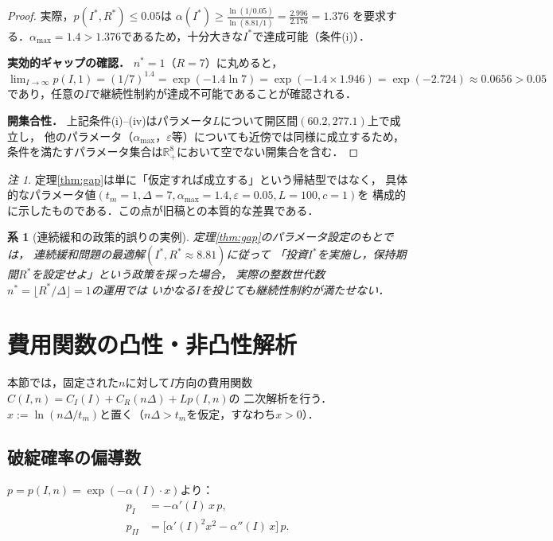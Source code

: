 \documentclass[12pt,a4paper]{article}
\theoremstyle{plain}
\newtheorem{corollary}[theorem]{系}
\theoremstyle{definition}
\theoremstyle{remark}
\newtheorem{remark}[theorem]{注}
\newcommand{\R}{\mathbb{R}}
\begin{document}
\begin{proof}
実際，$p(I^*, R^*) \le 0.05$は
$\alpha(I^*) \ge \frac{\ln(1/0.05)}{\ln(8.81/1)} = \frac{2.996}{2.176} = 1.376$
を要求する．$\alpha_{\max} = 1.4 > 1.376$であるため，十分大きな$I^*$で達成可能（条件(i)）．

\medskip\noindent
\textbf{実効的ギャップの確認．}
$n^* = 1$（$R = 7$）に丸めると，
$\lim_{I\to\infty}p(I,1) = (1/7)^{1.4} = \exp(-1.4\ln 7) = \exp(-1.4\times 1.946) = \exp(-2.724) \approx 0.0656 > 0.05$
であり，任意の$I$で継続性制約が達成不可能であることが確認される．

\medskip\noindent
\textbf{開集合性．}
上記条件(i)--(iv)はパラメータ$L$について開区間$(60.2, 277.1)$上で成立し，
他のパラメータ（$\alpha_{\max}$，$\varepsilon$等）についても近傍では同様に成立するため，
条件を満たすパラメータ集合は$\R_+^8$において空でない開集合を含む．
\end{proof}

\begin{remark}
定理\ref{thm:gap}は単に「仮定すれば成立する」という帰結型ではなく，
具体的なパラメータ値$(t_m=1, \Delta=7, \alpha_{\max}=1.4, \varepsilon=0.05, L=100, c=1)$を
構成的に示したものである．この点が旧稿との本質的な差異である．
\end{remark}

\begin{corollary}[連続緩和の政策的誤りの実例]
定理\ref{thm:gap}のパラメータ設定のもとでは，
連続緩和問題の最適解$(I^*, R^* \approx 8.81)$に従って
「投資$I^*$を実施し，保持期間$R^*$を設定せよ」という政策を採った場合，
実際の整数世代数$n^* = \lfloor R^*/\Delta \rfloor = 1$の運用では
いかなる$I$を投じても継続性制約が満たせない．
\end{corollary}

\section{費用関数の凸性・非凸性解析}
\label{sec:convexity}

本節では，固定された$n$に対して$I$方向の費用関数$C(I,n) = C_I(I) + C_R(n\Delta) + Lp(I,n)$の
二次解析を行う．$x := \ln(n\Delta/t_m)$と置く（$n\Delta > t_m$を仮定，すなわち$x > 0$）．

\subsection{破綻確率の偏導数}

$p = p(I,n) = \exp(-\alpha(I)\cdot x)$より：
\begin{align}
  p_I   &= -\alpha'(I)\,x\,p,\label{eq:pI}\\
  p_{II} &= \bigl[\alpha'(I)^2 x^2 - \alpha''(I)\,x\bigr]\,p.\label{eq:pII}
\end{align}
\end{document}
